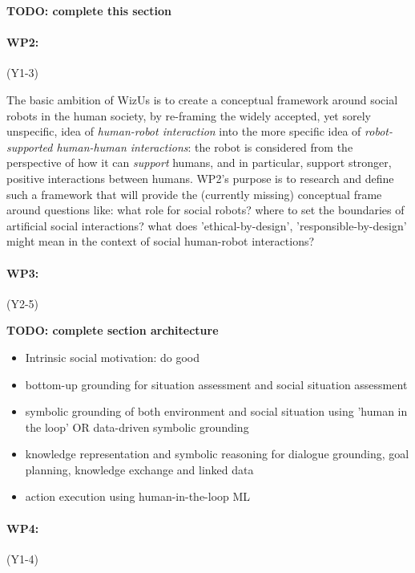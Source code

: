 \documentclass[11pt]{report}
\newcommand{\project}{WizUs\xspace}
\newcommand{\TODO}[1]{{\color{red}\textbf{TODO: #1}}}
\begin{document}
\TODO{complete this section}

\paragraph{WP2: \textbf{\wpTwo}} (Y1-3)

The basic ambition of \project is to create a conceptual framework
around social robots in the human society, by re-framing the widely accepted, yet
sorely unspecific, idea of \emph{human-robot interaction} into the more specific
idea of \emph{robot-supported human-human interactions}: the robot is considered
from the perspective of how it can \emph{support} humans, and in particular,
support stronger, positive interactions between humans. WP2's purpose is to research
and define such a framework that will
provide the (currently missing) conceptual frame around questions like: what role
for social robots? where to set the boundaries of artificial social
interactions? what does 'ethical-by-design', 'responsible-by-design' might mean
in the context of social human-robot interactions? 


\paragraph{WP3: \textbf{\wpThree}} (Y2-5)

\TODO{complete section architecture}

\begin{itemize}
    \item Intrinsic social motivation: do good
    \item bottom-up grounding for situation assessment and social situation
        assessment
    \item symbolic grounding of both environment and social situation using
        'human in the loop' OR data-driven symbolic grounding
    \item knowledge representation and symbolic reasoning for dialogue
        grounding, goal planning, knowledge exchange and linked data
    \item action execution using human-in-the-loop ML
\end{itemize}

\paragraph{WP4: \textbf{\wpFour}} (Y1-4)
\end{document}
